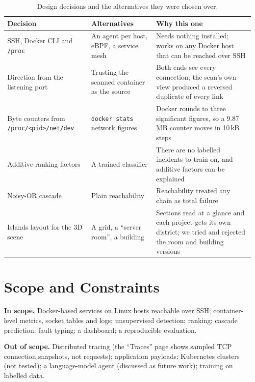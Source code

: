 \begin{table}[!htbp]
\centering
\caption{Design decisions and the alternatives they were chosen over.}
\label{tab:decisions}
\small
\renewcommand{\arraystretch}{1.2}
\begin{tabularx}{\textwidth}{>{\raggedright\arraybackslash}p{3.7cm}>{\raggedright\arraybackslash}p{3.3cm}>{\raggedright\arraybackslash}X}
\toprule
\textbf{Decision} & \textbf{Alternatives} & \textbf{Why this one}\\
\midrule
SSH, Docker CLI and \texttt{/proc} & An agent per host, eBPF, a service mesh & Needs nothing installed; works on any Docker host that can be reached over SSH\\
Direction from the listening port & Trusting the scanned container as the source & Both ends see every connection; the scan's own view produced a reversed duplicate of every link\\
Byte counters from \texttt{/proc/<pid>/net/dev} & \texttt{docker stats} network figures & Docker rounds to three significant figures, so a 9.87\,MB counter moves in 10\,kB steps\\
Additive ranking factors & A trained classifier & There are no labelled incidents to train on, and additive factors can be explained\\
Noisy-OR cascade & Plain reachability & Reachability treated any chain as total failure\\
Islands layout for the 3D scene & A grid, a ``server room'', a building & Sections read at a glance and each project gets its own district; we tried and rejected the room and building versions\\
\bottomrule
\end{tabularx}
\end{table}

\section{Scope and Constraints}
\textbf{In scope.} Docker-based services on Linux hosts reachable over SSH; container-level metrics, socket tables and logs; unsupervised detection; ranking; cascade prediction; fault typing; a dashboard; a reproducible evaluation.

\textbf{Out of scope.} Distributed tracing (the ``Traces'' page shows sampled TCP connection snapshots, not requests); application payloads; Kubernetes clusters (not tested); a language-model agent (discussed as future work); training on labelled data.

